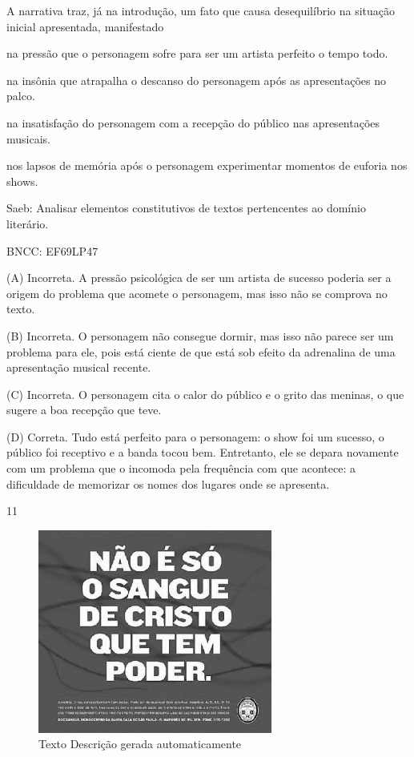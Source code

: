
A narrativa traz, já na introdução, um fato que causa desequilíbrio na
situação inicial apresentada, manifestado

\begin{escolha}
\item na pressão que o personagem sofre para ser um artista perfeito o
tempo todo.

\item na insônia que atrapalha o descanso do personagem após as
apresentações no palco.

\item na insatisfação do personagem com a recepção do público nas
apresentações musicais.

\item nos lapsos de memória após o personagem experimentar momentos de
euforia nos shows.
\end{escolha}

Saeb: Analisar elementos constitutivos de textos pertencentes ao domínio
literário.

BNCC: EF69LP47

(A) Incorreta. A pressão psicológica de ser um artista de sucesso
poderia ser a origem do problema que acomete o personagem, mas isso não
se comprova no texto.

(B) Incorreta. O personagem não consegue dormir, mas isso não parece ser
um problema para ele, pois está ciente de que está sob efeito da
adrenalina de uma apresentação musical recente.

(C) Incorreta. O personagem cita o calor do público e o grito das
meninas, o que sugere a boa recepção que teve.

(D) Correta. Tudo está perfeito para o personagem: o show foi um
sucesso, o público foi receptivo e a banda tocou bem. Entretanto, ele se
depara novamente com um problema que o incomoda pela frequência com que
acontece: a dificuldade de memorizar os nomes dos lugares onde se
apresenta.

\num{11}

\begin{figure}
\centering
\includegraphics[width=3.03125in,height=2.63521in]{./imgSAEB_8_POR/media/image36.png}
\caption{Texto Descrição gerada automaticamente}
\end{figure}

